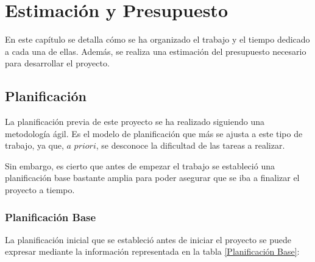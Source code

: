 \chapter{Estimación y Presupuesto}

En este capítulo se detalla cómo se ha organizado el trabajo y el tiempo dedicado a cada una de ellas. 
Además, se realiza una estimación del presupuesto necesario para desarrollar el proyecto.

\section{Planificación}

La planificación previa de este proyecto se ha realizado siguiendo una metodología ágil. 
Es el modelo de planificación que más se ajusta a este tipo de trabajo, ya que, $\textit{a priori}$, se desconoce la dificultad de las tareas a realizar. 

Sin embargo, es cierto que antes de empezar el trabajo se estableció una planificación base bastante amplia para poder asegurar que se iba a finalizar el proyecto a tiempo. 

\subsection{Planificación Base}

La planificación inicial que se estableció antes de iniciar el proyecto se puede expresar mediante la información representada en la tabla \ref{Planificación Base}:

